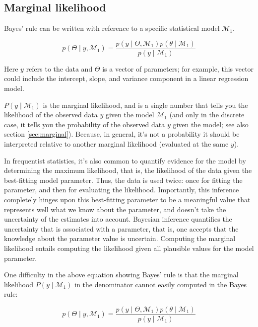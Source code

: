 \documentclass[12pt,]{krantz}
\theoremstyle{definition}
\theoremstyle{definition}
\theoremstyle{definition}
\theoremstyle{remark}
\begin{document}
\hypertarget{marginal-likelihood}{%
\subsection{Marginal likelihood}\label{marginal-likelihood}}

Bayes' rule can be written with reference to a specific statistical model \(\mathcal{M}_1\).

\begin{equation}
p(\Theta \mid y, \mathcal{M}_1) = \frac{p(y \mid \Theta, \mathcal{M}_1) p(\theta \mid \mathcal{M}_1)}{p(y \mid \mathcal{M}_1)}
\end{equation}

Here \(y\) refers to the data and \(\Theta\) is a vector of parameters; for example, this vector could include the intercept, slope, and variance component in a linear regression model.

\(P(y \mid \mathcal{M}_1)\) is the marginal likelihood, and is a single number that tells you the likelihood of the observed data \(y\) given the model \(\mathcal{M}_1\) (and only in the discrete case, it tells you the probability of the observed data \(y\) given the model; see also section \ref{sec:marginal}). Because, in general, it's not a probability it should be interpreted relative to another marginal likelihood (evaluated at the same \(y\)).

In frequentist statistics, it's also common to quantify evidence for the model by determining the maximum likelihood, that is, the likelihood of the data given the best-fitting model parameter. Thus, the data is used twice: once for fitting the parameter, and then for evaluating the likelihood. Importantly, this inference completely hinges upon this best-fitting parameter to be a meaningful value that represents well what we know about the parameter, and doesn't take the uncertainty of the estimates into account. Bayesian inference quantifies the uncertainty that is associated with a parameter, that is, one accepts that the knowledge about the parameter value is uncertain. Computing the marginal likelihood entails computing the likelihood given all plausible values for the model parameter.

One difficulty in the above equation showing Bayes' rule is that the marginal likelihood \(P(y \mid \mathcal{M}_1)\) in the denominator cannot easily computed in the Bayes rule:

\begin{equation}
p(\Theta \mid y, \mathcal{M}_1)  = \frac{p(y \mid \Theta, \mathcal{M}_1) p(\theta \mid \mathcal{M}_1)}{p(y \mid \mathcal{M}_1)}
\end{equation}
\end{document}
